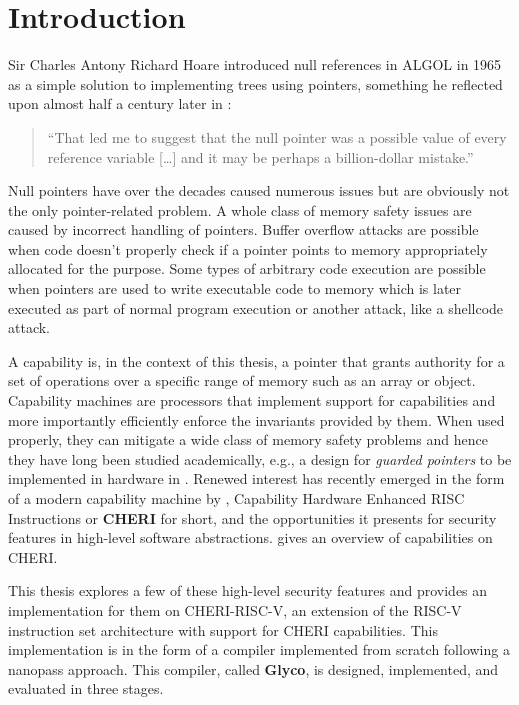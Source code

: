 \documentclass[main.tex]{subfiles}
\begin{document}
\onlyinsubfile{\mainmatter{}}

\chapter{Introduction}
Sir Charles Antony Richard Hoare introduced null references in ALGOL in 1965 as a simple solution to implementing trees using pointers, something he reflected upon almost half a century later in \cite{null}:
\begin{quote}
	\enquote{That led me to suggest that the null pointer was a possible value of every reference variable […] and it may be perhaps a billion-dollar mistake.}
\end{quote}

Null pointers have over the decades caused numerous issues but are obviously not the only pointer-related problem. A whole class of memory safety issues are caused by incorrect handling of pointers. Buffer overflow attacks are possible when code doesn't properly check if a pointer points to memory appropriately allocated for the purpose. Some types of arbitrary code execution are possible when pointers are used to write executable code to memory which is later executed as part of normal program execution or another attack, like a shellcode attack.

A capability is, in the context of this thesis, a pointer that grants authority for a set of operations over a specific range of memory such as an array or object. Capability machines are processors that implement support for capabilities and more importantly efficiently enforce the invariants provided by them. When used properly, they can mitigate a wide class of memory safety problems and hence they have long been studied academically, e.g., a design for \emph{guarded pointers} to be implemented in hardware in \cite{guardedptrs}. Renewed interest has recently emerged in the form of a modern capability machine by \cite{intro2cheri}, Capability Hardware Enhanced RISC Instructions or \textbf{CHERI} for short, and the opportunities it presents for security features in high-level software abstractions.  gives an overview of capabilities on CHERI.

This thesis explores a few of these high-level security features and provides an implementation for them on CHERI-RISC-V, an extension of the RISC-V instruction set architecture with support for CHERI capabilities. This implementation is in the form of a compiler implemented from scratch following a nanopass approach. This compiler, called \textbf{Glyco}, is designed, implemented, and evaluated in three stages.
\end{document}
